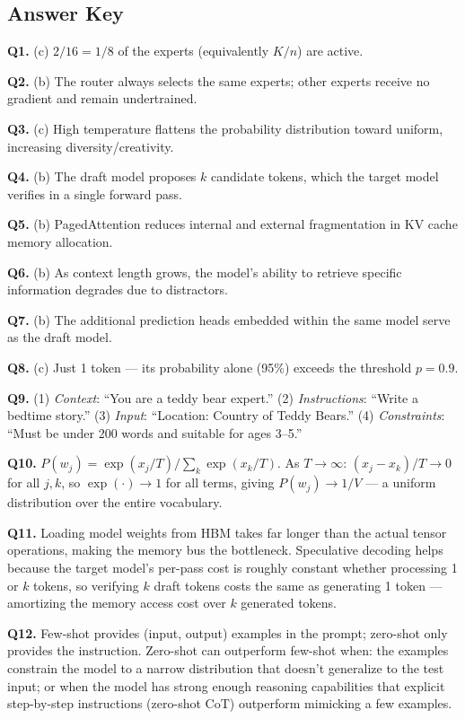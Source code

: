 \documentclass[11pt, a4paper]{article}
\begin{document}
\newpage
\subsection*{Answer Key}

\textbf{Q1.} (c) $2/16 = 1/8$ of the experts (equivalently $K/n$) are active.

\textbf{Q2.} (b) The router always selects the same experts; other experts receive no gradient and remain undertrained.

\textbf{Q3.} (c) High temperature flattens the probability distribution toward uniform, increasing diversity/creativity.

\textbf{Q4.} (b) The draft model proposes $k$ candidate tokens, which the target model verifies in a single forward pass.

\textbf{Q5.} (b) PagedAttention reduces internal and external fragmentation in KV cache memory allocation.

\textbf{Q6.} (b) As context length grows, the model's ability to retrieve specific information degrades due to distractors.

\textbf{Q7.} (b) The additional prediction heads embedded within the same model serve as the draft model.

\textbf{Q8.} (c) Just 1 token --- its probability alone (95\%) exceeds the threshold $p=0.9$.

\textbf{Q9.} (1) \textit{Context}: ``You are a teddy bear expert.'' (2) \textit{Instructions}: ``Write a bedtime story.'' (3) \textit{Input}: ``Location: Country of Teddy Bears.'' (4) \textit{Constraints}: ``Must be under 200 words and suitable for ages 3--5.''

\textbf{Q10.} $P(w_j) = \exp(x_j/T) / \sum_k \exp(x_k/T)$. As $T \to \infty$: $(x_j - x_k)/T \to 0$ for all $j, k$, so $\exp(\cdot) \to 1$ for all terms, giving $P(w_j) \to 1/V$ --- a uniform distribution over the entire vocabulary.

\textbf{Q11.} Loading model weights from HBM takes far longer than the actual tensor operations, making the memory bus the bottleneck. Speculative decoding helps because the target model's per-pass cost is roughly constant whether processing 1 or $k$ tokens, so verifying $k$ draft tokens costs the same as generating 1 token --- amortizing the memory access cost over $k$ generated tokens.

\textbf{Q12.} Few-shot provides (input, output) examples in the prompt; zero-shot only provides the instruction. Zero-shot can outperform few-shot when: the examples constrain the model to a narrow distribution that doesn't generalize to the test input; or when the model has strong enough reasoning capabilities that explicit step-by-step instructions (zero-shot CoT) outperform mimicking a few examples.
\end{document}
